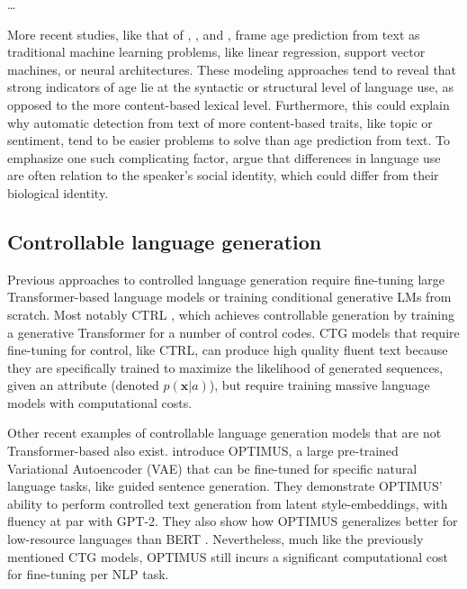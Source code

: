 \dots

More recent studies, like that of \cite{nguyen-etal-2011-author}, \cite{zheng2019personalized}, and \cite{abdallah2020age}, frame age prediction from text as traditional machine learning problems, like linear regression, support vector machines, or neural architectures. These modeling approaches tend to reveal that strong indicators of age lie at the syntactic or structural level of language use, as opposed to the more content-based lexical level. Furthermore, this could explain why automatic detection from text of more content-based traits, like topic or sentiment, tend to be easier problems to solve than age prediction from text. To emphasize one such complicating factor, \cite{nguyen2014gender} argue that differences in language use are often relation to the speaker's social identity, which could differ from their biological identity. 


\subsection{Controllable language generation}
Previous approaches to controlled language generation require fine-tuning large Transformer-based language models or training conditional generative LMs from scratch. Most notably CTRL \citep{keskarCTRL2019}, which achieves controllable generation by training a generative Transformer for a number of control codes. CTG models that require fine-tuning for control, like CTRL, can produce high quality fluent text because they are specifically trained to maximize the likelihood of generated sequences, given an attribute (denoted $p(\textbf{x} | a)$), but require training massive language models with computational costs.

Other recent examples of controllable language generation models that are not Transformer-based also exist. \cite{li-etal-2020-optimus} introduce OPTIMUS, a large pre-trained Variational Autoencoder (VAE) \citep{Kingma2014} that can be fine-tuned for specific natural language tasks, like guided sentence generation. They demonstrate OPTIMUS' ability to perform controlled text generation from latent style-embeddings, with fluency at par with GPT-2. They also show how OPTIMUS generalizes better for low-resource languages than BERT \citep{devlin-etal-2019-bert}. Nevertheless, much like the previously mentioned CTG models, OPTIMUS still incurs a significant computational cost for fine-tuning per NLP task.

